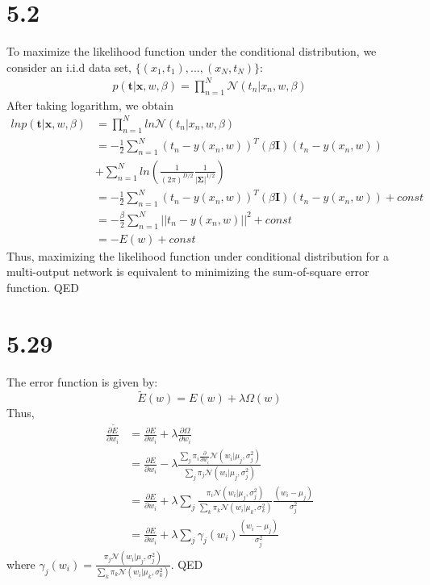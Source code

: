 \documentclass[10pt,a4paper,draft]{book}
\begin{document}
\section*{5.2}
To maximize the likelihood function under the conditional distribution, we consider an i.i.d data set, $\{(x_1,t_1),...,(x_N,t_N)\}$:
\begin{equation}
\begin{aligned}
p(\bm{t}|\bm{x},w,\beta) = \prod_{n=1}^{N}\mathcal{N}(t_n|x_n,w,\beta)
\end{aligned}
\end{equation}
After taking logarithm, we obtain
\begin{equation}
\begin{aligned}
lnp(\bm{t}|\bm{x},w,\beta) &= \prod_{n=1}^{N}ln\mathcal{N}(t_n|x_n,w,\beta) \\
&= -\frac{1}{2}\sum_{n=1}^{N} (t_n-y(x_n,w))^T(\beta\bm{I})(t_n-y(x_n,w)) \\ &+ \sum_{n=1}^{N} ln(\frac{1}{(2\pi)^{D/2}}\frac{1}{|\bm{\Sigma}|^{1/2}}) \\
&= -\frac{1}{2}\sum_{n=1}^{N} (t_n-y(x_n,w))^T(\beta\bm{I})(t_n-y(x_n,w)) + const\\
&= -\frac{\beta}{2}\sum_{n=1}^{N} ||t_n-y(x_n,w)||^2+ const \\
&= -E(w)+ const
\end{aligned}
\end{equation}
Thus, maximizing the likelihood function under conditional distribution for a multi-output network is equivalent to minimizing the sum-of-square error function. QED

\section*{5.29}
The error function is given by:
\begin{equation}
\tilde{E}(w) = E(w) + \lambda \Omega(w)
\end{equation}
Thus,
\begin{equation}
\begin{aligned}
\frac{\partial \tilde{E}}{\partial w_i} &= \frac{\partial E}{\partial w_i} + \lambda \frac{\partial \Omega}{\partial w_i} \\
&=  \frac{\partial E}{\partial w_i} - \lambda  \frac{\sum_{j}\pi_i \frac{\partial}{\partial w_i} \mathcal{N}(w_i|\mu_j,\sigma_j^2)}{\sum_{j}\pi_j \mathcal{N}(w_i|\mu_j,\sigma^2_j)}  \\
&= \frac{\partial E}{\partial w_i} + \lambda \sum_{j} \frac{\pi_i \mathcal{N}(w_i|\mu_j,\sigma_j^2)}{\sum_{k}\pi_k \mathcal{N}(w_i|\mu_k,\sigma^2_k)} \frac{(w_i-\mu_j)}{\sigma^2_j} \\
&= \frac{\partial E}{\partial w_i} + \lambda \sum_{j} \gamma_j(w_i)\frac{(w_i-\mu_j)}{\sigma^2_j}
\end{aligned} 
\end{equation}
where $\gamma_j(w_i) = \frac{\pi_j \mathcal{N}(w_i|\mu_j,\sigma_j^2)}{\sum_{k}\pi_k \mathcal{N}(w_i|\mu_k,\sigma^2_k)}$. QED
\end{document}
